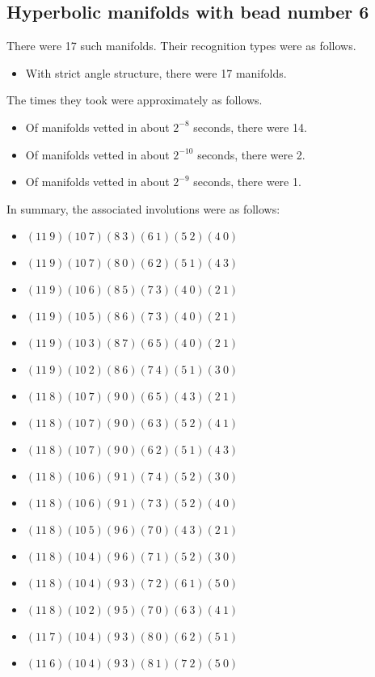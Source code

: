 \documentclass{article}
\begin{document}
\subsection{Hyperbolic manifolds with bead number 6}
There were 17 such manifolds.
Their recognition types were as follows.
\begin{itemize}
\item With strict angle structure, there were 17 manifolds.
\end{itemize}
The times they took were approximately as follows.
\begin{itemize}
\item Of manifolds vetted in about $2^{-8}$ seconds, there were 14.
\item Of manifolds vetted in about $2^{-10}$ seconds, there were 2.
\item Of manifolds vetted in about $2^{-9}$ seconds, there were 1.
\end{itemize}
In summary, the associated involutions were as follows:
\begin{itemize}
\item $(11\ 9)(10\ 7)(8\ 3)(6\ 1)(5\ 2)(4\ 0)$
\item $(11\ 9)(10\ 7)(8\ 0)(6\ 2)(5\ 1)(4\ 3)$
\item $(11\ 9)(10\ 6)(8\ 5)(7\ 3)(4\ 0)(2\ 1)$
\item $(11\ 9)(10\ 5)(8\ 6)(7\ 3)(4\ 0)(2\ 1)$
\item $(11\ 9)(10\ 3)(8\ 7)(6\ 5)(4\ 0)(2\ 1)$
\item $(11\ 9)(10\ 2)(8\ 6)(7\ 4)(5\ 1)(3\ 0)$
\item $(11\ 8)(10\ 7)(9\ 0)(6\ 5)(4\ 3)(2\ 1)$
\item $(11\ 8)(10\ 7)(9\ 0)(6\ 3)(5\ 2)(4\ 1)$
\item $(11\ 8)(10\ 7)(9\ 0)(6\ 2)(5\ 1)(4\ 3)$
\item $(11\ 8)(10\ 6)(9\ 1)(7\ 4)(5\ 2)(3\ 0)$
\item $(11\ 8)(10\ 6)(9\ 1)(7\ 3)(5\ 2)(4\ 0)$
\item $(11\ 8)(10\ 5)(9\ 6)(7\ 0)(4\ 3)(2\ 1)$
\item $(11\ 8)(10\ 4)(9\ 6)(7\ 1)(5\ 2)(3\ 0)$
\item $(11\ 8)(10\ 4)(9\ 3)(7\ 2)(6\ 1)(5\ 0)$
\item $(11\ 8)(10\ 2)(9\ 5)(7\ 0)(6\ 3)(4\ 1)$
\item $(11\ 7)(10\ 4)(9\ 3)(8\ 0)(6\ 2)(5\ 1)$
\item $(11\ 6)(10\ 4)(9\ 3)(8\ 1)(7\ 2)(5\ 0)$
\end{itemize}
\end{document}

